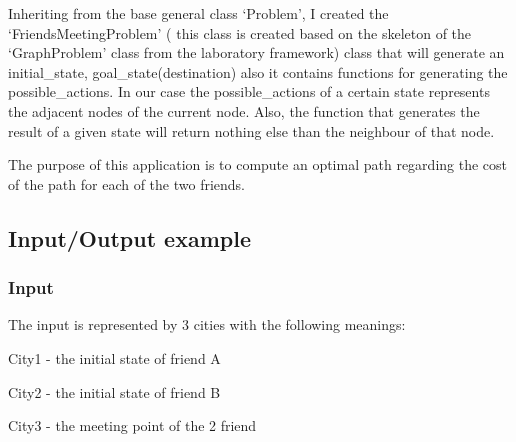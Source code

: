 \documentclass[12pt]{article}
\begin{document}
\begin{justify}
Inheriting from the base general class ‘Problem’, I created the ‘FriendsMeetingProblem’ ( this class is created based on the skeleton of the ‘GraphProblem’ class from the laboratory framework) class that will generate an initial\_state, goal\_state(destination) also it contains functions for generating the possible\_actions. In our case the possible\_actions of a certain state represents the adjacent nodes of the current node. Also, the function that generates the result of a given state will return nothing else than the neighbour of that node.
\end{justify}\par

\begin{justify}
The purpose of this application is to compute an optimal path regarding the cost of the path for each of the two friends. 
\end{justify}\par

\subsection*{Input/Output example}
\subsubsection*{\hspace*{10pt}Input}
\begin{justify}
\tab The input is represented by 3 cities with the following meanings:
\end{justify}\par

\begin{justify}
\tab City1 - the initial state of friend A
\end{justify}\par

\begin{justify}
\tab City2 - the initial state of friend B
\end{justify}\par

\begin{justify}
\tab City3 - the meeting point of the 2 friend
\end{justify}\par
\end{document}
